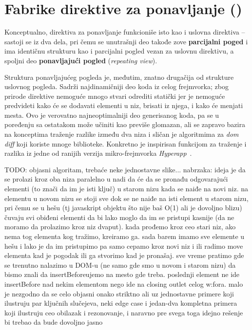 \section{Fabrike direktive za ponavljanje ()}
\label{sec:fabrike-direktive-za-ponavljanje}

Konceptualno, direktiva za ponavljanje funkcioniše isto kao i uslovna direktiva -- sastoji se iz dva dela, pri čemu se unutrašnji deo takođe zove \textbf{parcijalni poged} i ima identičnu strukturu kao i parcijalni pogled vezan za uslovnu direktivu, a spoljni deo \textbf{ponavljajući pogled} (\textsl{repeating view}).

Struktura ponavljajućeg pogleda je, međutim, znatno drugačija od strukture uslovnog pogleda.
Sadrži najdinamičniji deo koda iz celog frejmvorka; zbog prirode direktive nemoguće mnogo stvari odrediti statički jer je nemoguće predvideti kako će se dodavati elementi u niz, brisati iz njega, i kako će menjati mesta.
Ovo je verovatno najneoptimalniji deo generisanog koda, pa se u poređenju sa ostatakom može učiniti kao previše glomazan, ali se zapravo bazira na konceptima traženje razlike između dva niza i sličan je algoritmima za \textit{dom diff} koji koriste mnoge biblioteke.
Konkretno je inspirisan funkcijom za traženje i  razlika iz jedne od ranijih verzija mikro-frejmvorka \textit{Hyperapp}~\cite{hyperapp:patch}.

TODO: objasni algoritam, trebaće neke jednostavne slike... nabrzaka: ideja je da se prolazi kroz oba niza paralelno u nadi da će da se pronađu odgovarajući elementi (to znači da im je isti ključ) u starom nizu kada se naiđe na novi niz. na elementu u novom nizu se stoji sve dok se ne naiđe na isti element u starom nizu, pri čemu se u hešu (tj javaskript objektu što nije baš O(1) ali je dovoljno blizu) čuvaju svi obiđeni elementi da bi lako moglo da im se pristupi kasnije (da ne moramo da prolazimo kroz niz dvaput). kada prođemo kroz ceo stari niz, ako nema tog elementa kog tražimo, kreiramo ga. sada barem imamo sve elemente u hešu i lako je da im pristupimo pa samo cepamo kroz novi niz i ili radimo move elementa kad je pogodak ili ga stvorimo kad je pronašaj. sve vreme pratimo gde se trenutno nalazimo u DOM-u (ne samo gde smo u novom i starom nizu) da bismo znali da insertBeforeujemo na mesto gde treba. poslednji element ne ide insertBefore nad nekim elementom nego ide na closing outlet celog w:fora. malo je nezgodno da se celo objasni onako striktno ali uz jednostavne primere koji ilustruju par ključnih slučejeva, neki edge case i jedan-dva kompletna primera koji ilustruju ceo obilazak i rezonovanje, i naravno pre svega toga idejno rešenje bi trebao da bude dovoljno jasno
